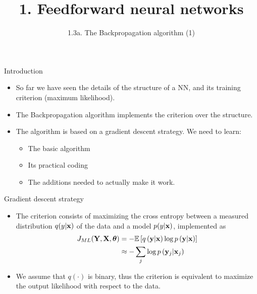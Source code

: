 \documentclass{beamer}
\title{1. Feedforward neural networks}
\subtitle{1.3a. The Backpropagation algorithm (1)}
\begin{document}
\maketitle

\begin{frame}{Introduction}
    \begin{itemize}
        \item So far we have seen the details of the structure of a NN, and its training criterion (maximum likelihood). 
        \item The Backpropagation algorithm implements the criterion over the structure. 
        \item The algorithm is based on a gradient descent strategy. We need to learn:
        \begin{itemize}
            \item The basic algorithm 
            \item Its practical coding
            \item The additions needed to actually make it work.
        \end{itemize}
    \end{itemize}
\end{frame}

\begin{frame}{Gradient descent strategy}
\begin{itemize}
    \item The criterion consists of maximizing the cross entropy between a measured distribution $q(y|{\bf x})$ of the data and a model  $p(y|{\bf x})$, implemented as 
    \begin{equation}
    \begin{split}
        J_{ML}({\bf Y},{\bf X},{\boldsymbol \theta}) & = -\mathbb{E} \left[ q\left({\bf y}|{\bf x}\right)\log p\left({\bf y}|{\bf x} \right)\right]\\
        & \approx - \sum_{j} \log p\left({\bf y}_j|{\bf x}_j \right)
    \end{split}
    \end{equation}
\item 
We assume that $q(\cdot)$ is binary, thus the criterion is equivalent to maximize the output likelihood with respect to the data. 
\end{itemize}
\end{frame}
\end{document}

